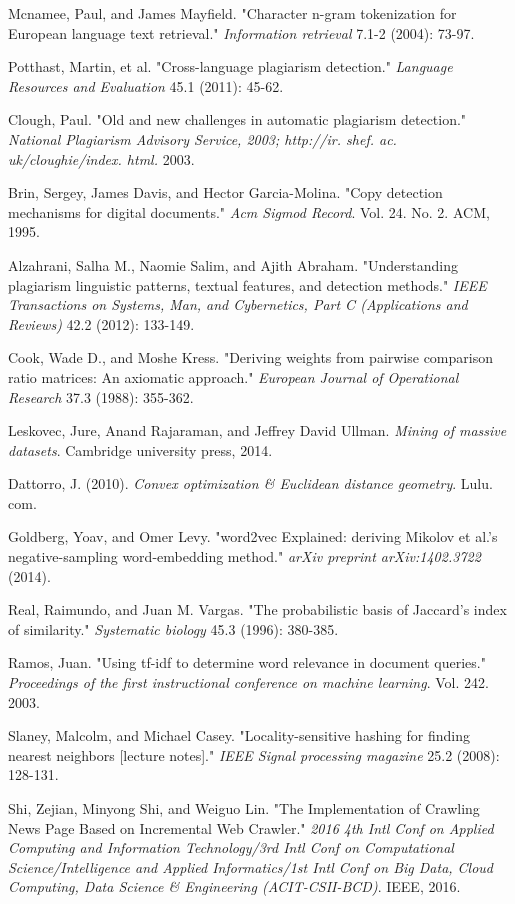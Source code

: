 \documentclass[12pt]{report}
\begin{document}
\begin{thebibliography}{9}
	Mcnamee, Paul, and James Mayfield. "Character n-gram tokenization for European language text retrieval." \textit{Information retrieval} 7.1-2 (2004): 73-97.
	
	Potthast, Martin, et al. "Cross-language plagiarism detection." \textit{Language Resources and Evaluation} 45.1 (2011): 45-62.
	
	Clough, Paul. "Old and new challenges in automatic plagiarism detection." \textit{National Plagiarism Advisory Service, 2003; http://ir. shef. ac. uk/cloughie/index. html.} 2003.
	
	Brin, Sergey, James Davis, and Hector Garcia-Molina. "Copy detection mechanisms for digital documents." \textit{Acm Sigmod Record}. Vol. 24. No. 2. ACM, 1995.
	
	Alzahrani, Salha M., Naomie Salim, and Ajith Abraham. "Understanding plagiarism linguistic patterns, textual features, and detection methods." \textit{IEEE Transactions on Systems, Man, and Cybernetics, Part C (Applications and Reviews)} 42.2 (2012): 133-149.
	
	Cook, Wade D., and Moshe Kress. "Deriving weights from pairwise comparison ratio matrices: An axiomatic approach." \textit{European Journal of Operational Research} 37.3 (1988): 355-362.
	
	Leskovec, Jure, Anand Rajaraman, and Jeffrey David Ullman. \textit{Mining of massive datasets}. Cambridge university press, 2014.

	Dattorro, J. (2010). \textit{Convex optimization \& Euclidean distance geometry}. Lulu. com.

	Goldberg, Yoav, and Omer Levy. "word2vec Explained: deriving Mikolov et al.'s negative-sampling word-embedding method." \textit{arXiv preprint arXiv:1402.3722} (2014).

	Real, Raimundo, and Juan M. Vargas. "The probabilistic basis of Jaccard's index of similarity." \textit{Systematic biology} 45.3 (1996): 380-385.

	Ramos, Juan. "Using tf-idf to determine word relevance in document queries." \textit{Proceedings of the first instructional conference on machine learning}. Vol. 242. 2003.

	Slaney, Malcolm, and Michael Casey. "Locality-sensitive hashing for finding nearest neighbors [lecture notes]." \textit{IEEE Signal processing magazine} 25.2 (2008): 128-131.

	Shi, Zejian, Minyong Shi, and Weiguo Lin. "The Implementation of Crawling News Page Based on Incremental Web Crawler." \textit{2016 4th Intl Conf on Applied Computing and Information Technology/3rd Intl Conf on Computational Science/Intelligence and Applied Informatics/1st Intl Conf on Big Data, Cloud Computing, Data Science \& Engineering (ACIT-CSII-BCD)}. IEEE, 2016.
\end{thebibliography}
\end{document}
